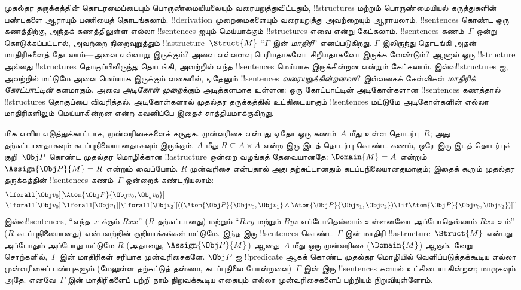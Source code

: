 \documentclass[../../../include/open-logic-section]{subfiles}
\begin{document}


முதல்தர தருக்கத்தின் தொடரமைப்பையும் பொருண்மையியலையும் வரையறுத்துவிட்டதும்,
!!{structure}s மற்றும் பொருண்மையியல் கருத்துகளின் பண்புகளை ஆராயும் பணியைத்
தொடங்கலாம். !!{derivation} முறைமைகளையும் வரையறுத்து அவற்றையும் ஆராயலாம்.
!!{sentence}s கொண்ட ஒரு கணத்திற்கு, அந்தக் கணத்திலுள்ள எல்லா !!{sentence}s ஐயும்
மெய்யாக்கும் !!{structure}s எவை என்று கேட்கலாம். !!{sentence}s கணம்~$\Gamma$
ஒன்று கொடுக்கப்பட்டால், அவற்றை நிறைவுறுத்தும் !!a{structure}~$\Struct{M}$
``$\Gamma$ இன் \emph{மாதிரி}'' எனப்படுகிறது. $\Gamma$ இலிருந்து தொடங்கி
அதன் மாதிரிகளைத் தேடலாம்---அவை எவ்வாறு இருக்கும்? அவை எவ்வளவு பெரியதாகவோ
சிறியதாகவோ இருக்க வேண்டும்? ஆனால் ஒரு !!{structure} அல்லது !!{structure}s
தொகுப்பிலிருந்து தொடங்கி, அவற்றில் எந்த !!{sentence}s மெய்யாக இருக்கின்றன
என்றும் கேட்கலாம். இவ்வ!!{structure}s ஐ, அவற்றில் மட்டுமே அவை மெய்யாக இருக்கும்
வகையில், ஏதேனும் !!{sentence}s \emph{வரையறுக்கின்றனவா}? இவ்வகைக் கேள்விகள்
\emph{மாதிரிக் கோட்பாட்டின்} களமாகும். அவை \emph{அடிகோள் முறை}க்கும்
அடித்தளமாக உள்ளன: ஒரு கோட்பாட்டின் அடிகோள்களான !!{sentence}s கணத்தால்
!!{structure}s தொகுப்பை விவரித்தல். அடிகோள்களால் முதல்தர தருக்கத்தில்
உட்கிடையாகும் !!{sentence}s மட்டுமே அடிகோள்களின் எல்லா மாதிரிகளிலும்
மெய்யாகின்றன என்ற கவனிப்பே இதைச் சாத்தியமாக்குகிறது.

மிக எளிய எடுத்துக்காட்டாக, முன்வரிசைகளைக் கருதுக. முன்வரிசை என்பது ஏதோ ஒரு
கணம்~$A$ மீது உள்ள தொடர்பு~$R$; அது தற்சுட்டானதாகவும் கடப்புநிலையானதாகவும்
இருக்கும். $A$ மீது $R \subseteq A \times A$ என்ற இரு-இடத் தொடர்பு கொண்ட
கணம், ஒரே இரு-இடத் தொடர்புக் குறி~$\Obj P$ கொண்ட முதல்தர மொழிக்கான
!!a{structure} ஒன்றை வழங்கத் தேவையானதே: $\Domain{M} = A$ என்றும்
$\Assign{\Obj P}{M} = R$ என்றும் வைப்போம். $R$ முன்வரிசை என்பதால் அது
தற்சுட்டானதும் கடப்புநிலையானதுமாகும்; இதைக் கூறும் முதல்தர தருக்கத்தின்
!!{sentence}s கணம்~$\Gamma$ ஒன்றைக் கண்டறியலாம்:
\begin{align*}
  & \lforall[\Obj v_0][\Atom{\Obj P}{\Obj v_0,\Obj v_0}]\\
  & \lforall[\Obj v_0][\lforall[\Obj v_1][\lforall[\Obj v_2][((\Atom{\Obj P}{\Obj v_0,\Obj v_1} \land \Atom{\Obj P}{\Obj v_1,\Obj v_2}) \lif \Atom{\Obj P}{\Obj v_0,\Obj v_2})]]]
\end{align*}
இவ்வ!!{sentence}s, ``எந்த~$x$ க்கும் $Rxx$'' ($R$ தற்சுட்டானது) மற்றும்
``$Rxy$ மற்றும் $Ryz$ எப்போதெல்லாம் உள்ளனவோ அப்போதெல்லாம் $Rxz$ உம்''
($R$ கடப்புநிலையானது) என்பவற்றின் குறியாக்கங்கள் மட்டுமே. இந்த இரு
!!{sentence}s கொண்ட~$\Gamma$ இன் மாதிரி !!a{structure}~$\Struct{M}$ என்பது அப்போதும் அப்போது
மட்டுமே $R$ (அதாவது, $\Assign{\Obj P}{M}$) ஆனது~$A$ மீது ஒரு முன்வரிசை
($\Domain{M}$) ஆகும். வேறு சொற்களில்,~$\Gamma$ இன் மாதிரிகள் சரியாக
முன்வரிசைகளே. $\Obj P$ ஐ !!{predicate} ஆகக் கொண்ட முதல்தர மொழியில்
வெளிப்படுத்தக்கூடிய எல்லா முன்வரிசைப் பண்புகளும் (மேலுள்ள தற்சுட்டுத் தன்மை,
கடப்புநிலை போன்றவை)~$\Gamma$ இன் இரு !!{sentence}s களால் உட்கிடையாகின்றன;
மாறாகவும் அதே. எனவே~$\Gamma$ இன் மாதிரிகளைப் பற்றி நாம் நிறுவக்கூடிய எதையும்
எல்லா முன்வரிசைகளைப் பற்றியும் நிறுவியுள்ளோம்.
\end{document}
